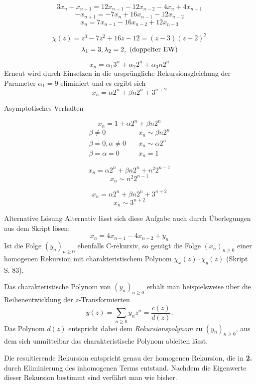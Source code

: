 \begin{flushenum}
\begin{flushalpha}
      \[ 3x_{n} - x_{n+1} = 12x_{n-1} - 12x_{n-2} - 4x_{n} + 4x_{n-1} \]
      \[ -x_{n+1} = -7x_{n} + 16x_{n-1} - 12x_{n-2} \]
      \[ x_{n} = 7x_{n-1} - 16x_{n-2} + 12x_{n-3} \]

      \[ \chi(z) = z^{3} - 7z^{2} + 16z - 12 = (z - 3) (z - 2)^{2} \]
      \[ \lambda_{1} = 3, \lambda_{2} = 2, \textnormal{ (doppelter EW)} \]

      \[ x_{n} = \alpha_{1}3^{n} + \alpha_{2}2^{n} + \alpha_{3}n2^{n} \]
      Erneut wird durch Einsetzen in die ursprüngliche Rekursionsgleichung der
      Parameter $\alpha_{1} = 9$ eliminiert und es ergibt sich
      \[ x_{n} = \alpha 2^{n} + \beta n2^{n} + 3^{n+2} \]
  \end{flushalpha}
  \begin{paragraph}{Asymptotisches Verhalten}
	  \begin{flushalpha}
      \item \[ x_{n} = 1 + \alpha 2^{n} + \beta n2^{n} \]
        \begin{equation*}
          \begin{split}
           \beta \not= 0 &\quad x_{n} \sim \beta n2^{n} \\
           \beta = 0, \alpha \not= 0 &\quad x_{n} \sim \alpha 2^{n} \\
           \beta = \alpha = 0 & \quad x_{n} = 1
          \end{split}
        \end{equation*}
      \item \[ x_{n} = \alpha2^{n} + \beta n2^{n} + n^{2}2^{n-1}\]
        \[ x_{n} \sim n^{2}2^{n-1} \]
      \item \[ x_{n} = \alpha 2^{n} + \beta n2^{n} + 3^{n+2} \]
        \[ x_{n} \sim 3^{n+2} \]
    \end{flushalpha}
  \end{paragraph}
  \begin{paragraph}{Alternative Lösung}
	Alternativ lässt sich diese Aufgabe auch durch Überlegungen aus dem
	Skript lösen:
	\[ x_{n} = 4x_{n-1} - 4x_{n-2} + y_{n} \]
	Ist die Folge $(y_n)_{n\geq 0}$ ebenfalls C-rekursiv, so genügt die
	Folge $(x_n)_{n\geq 0}$ einer homogenen Rekursion mit
	charakteristischem Polynom $\chi_x(z)\cdot\chi_y(z)$ (Skript S. 83).

	Das charakteristische Polynom von $(y_n)_{n\geq 0}$ erhält man
	beispielsweise über die Rei\-hen\-ent\-wicklung der $z$-Transformierten
	\[ y(z) = \sum_{n\geq 0} y_n z^n = \frac{c(z)}{d(z)}. \]
	Das Polynom $d(z)$ entspricht dabei dem \textit{Rekursionspolynom} zu
	$(y_n)_{n\geq 0}$, aus dem sich unmittelbar das charakteristische
	Polynom ableiten lässt.

	Die resultierende Rekursion entspricht genau der homogenen Rekursion,
	die in \textbf{2.} durch Eliminierung des inhomogenen Terms entstand.
	Nachdem die Eigenwerte dieser Rekursion bestimmt sind verfährt man wie
	bisher.
  \end{paragraph}
\end{flushenum}
